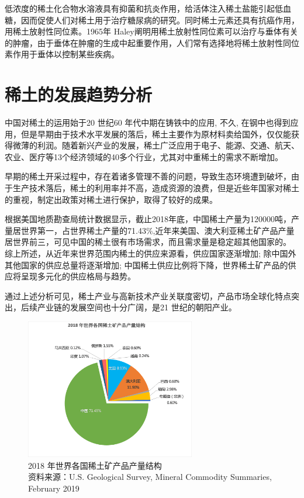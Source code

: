 \documentclass[twoside,twocolumn]{article}
\begin{document}
低浓度的稀土化合物水溶液具有抑菌和抗炎作用，给活体注入稀土盐能引起低血糖，因而促使人们对稀土用于治疗糖尿病的研究。同时稀土元素还具有抗癌作用，用稀土放射性同位素。1965年 Haley阐明用稀土放射性同位素可以治疗与垂体有关的肿瘤，由于垂体在肿瘤的生成中起重要作用，人们常有选择地将稀土放射性同位素作用于垂体以控制某些疾病。

\section{稀土的发展趋势分析}
中国对稀土的运用始于20 世纪60 年代中期在铸铁中的应用, 不久, 在钢中也得到应用，但是早期由于技术水平发展的落后，稀土主要作为原材料卖给国外，仅仅能获得微薄的利润。随着新兴产业的发展，稀土广泛应用于电子、能源、交通、航天、农业、医疗等13个经济领域的40多个行业，尤其对中重稀土的需求不断增加。

早期的稀土开采过程中，存在着诸多管理不善的问题，导致生态环境遭到破坏，由于生产技术落后，稀土的利用率并不高，造成资源的浪费，但是近些年国家对稀土的重视，制定出政策对稀土进行保护，取得了较好的成果。\cite{RN5}

根据美国地质勘查局统计数据显示，截止2018年底，中国稀土产量为120000吨，产量居世界第一，占世界稀土产量的71.43$\%$,近年来美国、澳大利亚稀土矿产品产量居世界前三，可见中国的稀土很有市场需求，而且需求量是稳定超其他国家的。
综上所述，从近年来世界范围内稀土的供应来源看，供应国家逐渐增加; 除中国外其他国家的供应总量将逐渐增加; 中国稀土供应比例将下降，世界稀土矿产品的供应将呈现多元化的供应格局与趋势。

通过上述分析可见，稀土产业与高新技术产业关联度密切，产品市场全球化特点突出，后续产业链的发展空间也十分广阔，是21 世纪的朝阳产业。

\begin{figure}[th]
  \centering
  \includegraphics[width=20em]{figure1.png}
  \caption{2018 年世界各国稀土矿产品产量结构\cite{RN8}\\资料来源：U.S. Geological Survey, Mineral Commodity Summaries, February 2019}
\end{figure}
\end{document}
